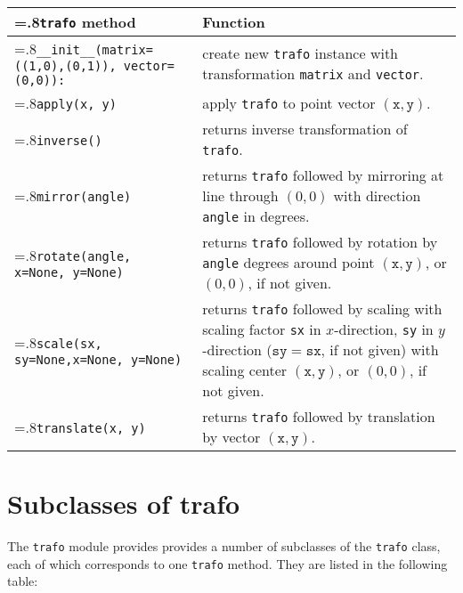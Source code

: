 \medskip
\begin{tabularx}{\linewidth}{>{\hsize=.8\hsize}X>{\raggedright\arraybackslash\hsize=1.2\hsize}X}
\texttt{trafo} method & Function \\
\hline
\texttt{\_\_init\_\_(matrix=((1,0),(0,1)),\newline
\phantom{\_\_init\_\_(}vector=(0,0)):} & create new \texttt{trafo}
instance with transformation \texttt{matrix} and \texttt{vector}.
\\
\texttt{apply(x, y)} & apply \texttt{trafo} to point vector
$(\mathtt{x}, \mathtt{y})$.\\
\texttt{inverse()} & returns inverse transformation of
\texttt{trafo}.\\
\texttt{mirror(angle)} & returns \texttt{trafo} followed by mirroring
at line through $(0,0)$ with  direction \texttt{angle} in degrees.\\
\texttt{rotate(angle, \newline\phantom{rotate(}x=None, y=None)} &
returns \texttt{trafo} followed by rotation by \texttt{angle} degrees
around point $(\mathtt{x},
\mathtt{y})$, or $(0,0)$, if not given.\\
\texttt{scale(sx, sy=None,\newline\phantom{scale(}x=None, y=None)} &
returns \texttt{trafo} followed by
scaling with scaling factor \texttt{sx} in $x$-direction, \texttt{sy} in
$y$-direction ($\mathtt{sy}=\mathtt{sx}$, if not given) with scaling
center $(\mathtt{x}, \mathtt{y})$, or $(0,0)$, if not given.\\
\texttt{translate(x, y)} & returns \texttt{trafo} followed by
translation by vector $(\mathtt{x}, \mathtt{y})$.\\
\end{tabularx}
\medskip



\section{Subclasses of trafo}

The \verb|trafo| module provides provides a number of subclasses of
the \verb|trafo| class, each of which corresponds to one \verb|trafo|
method. They are listed in the following table:

